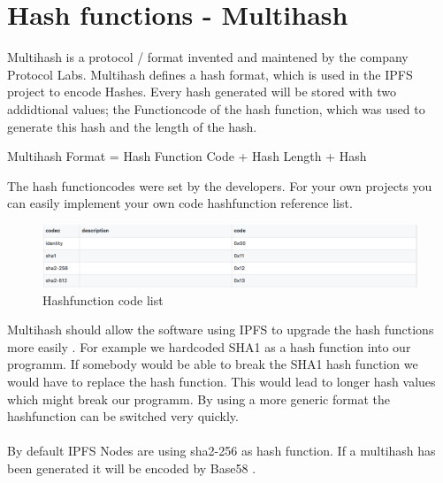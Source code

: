 \documentclass[a4paper,11pt, oneside]{report}
\theoremstyle{definition}
\begin{document}
\section{Hash functions - Multihash}
Multihash is a protocol / format  invented and maintened by the company Protocol Labs. Multihash defines a hash format, which is used in the IPFS project to encode Hashes. Every hash generated will be stored with two addidtional values; the Functioncode of the  hash function, which was used to generate this hash and the length of the hash.
\begin{center}
	Multihash Format = Hash Function Code + Hash Length + Hash
\end{center}
The hash functioncodes were set by the developers. For your own projects you can easily implement your own code hashfunction reference list.\\[0.3cm]
\begin{figure}[H]
\centering
\includegraphics[width=\textwidth]{img/multiformat_hashfunctionid.png}
\caption[Hashfunction code list]{Hashfunction code list}
\end{figure}
\noindent
Multihash should allow the software using IPFS to upgrade the hash functions more easily \cite{multihash}. For example we hardcoded SHA1 as a hash function into our programm. If somebody would be able to break the SHA1 hash function we would have to replace the hash function. This would lead to longer hash values which might break our programm. By using a more generic format the hashfunction can be switched very quickly.\\ \\
By default IPFS Nodes are using sha2-256 as hash function. If a multihash has been generated it will be encoded by Base58 \cite{Encoding}.
\end{document}
